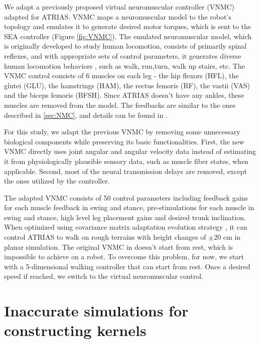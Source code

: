 We adapt a previously proposed virtual neuromuscular controller (VNMC) \cite{batts2015toward} adapted for ATRIAS. VNMC maps a neuromuscular model to the robot's topology and emulates it to generate desired motor torques, which is sent to the SEA controller (Figure \ref{fig:VNMC}).
The emulated neuromuscular model, which is originally developed to study human locomotion, consists of primarily spinal reflexes, and with appropriate sets of control parameters, it generates diverse human locomotion behaviors \cite{song2015neural}, such as walk, run,turn, walk up stairs, etc. The VNMC control consists of 6 muscles on each leg - the hip flexors (HFL), the glutei (GLU), the hamstrings (HAM), the rectus femoris (RF), the vastii (VAS) and the biceps femoris (BFSH). Since ATRIAS doesn't have any ankles, these muscles are removed from the model. The feedbacks are similar to the ones described in \ref{sec:NMC}, and details can be found in \cite{song2015neural}.

For this study, we adapt the previous VNMC \cite{batts2015toward} by removing some unnecessary biological components while preserving its basic functionalities.
First, the new VNMC directly uses joint angular and angular velocity data instead of estimating it from physiologically plausible sensory data, such as muscle fiber states, when applicable.
Second, most of the neural transmission delays are removed, except the ones utilized by the controller.

The adapted VNMC consists of 50 control parameters including feedback gains for each muscle feedback in swing and stance, pre-stimulations for each muscle in swing and stance, high level leg placement gains and desired trunk inclination. When optimized using covariance matrix adaptation evolution strategy \cite{hansen2006cma}, it can control ATRIAS to walk on rough terrains with height changes of $\pm$20 cm in planar simulation. The original VNMC in \cite{batts2015toward} doesn't start from rest, which is impossible to achieve on a robot. To overcome this problem, for now, we start with a 5-dimensional walking controller that can start from rest. Once a desired speed if reached, we switch to the virtual neuromuscular control.

\section{Inaccurate simulations for constructing kernels}

